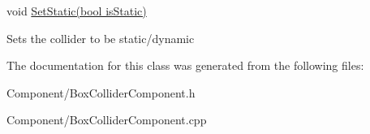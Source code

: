 void \hyperlink{classrvl_1_1_box_collider_component_aaa7a7e7213f89532aa0b8a311ff264f8}{Set\+Static(bool is\+Static)} 

Sets the collider to be static/dynamic 

The documentation for this class was generated from the following files\+:\begin{DoxyCompactItemize}
\item 
Component/Box\+Collider\+Component.\+h\item 
Component/Box\+Collider\+Component.\+cpp\end{DoxyCompactItemize}
